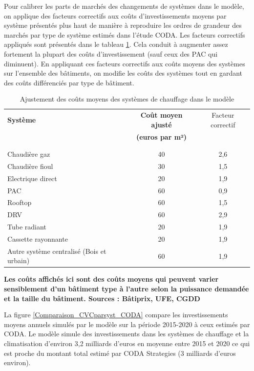 \documentclass[10.5pt,a4paper]{article}
\begin{document}
{Pour calibrer les parts de marchés des changements de systèmes dans le modèle, on applique des facteurs correctifs aux coûts d'investissements moyens par système présentés plus haut de manière à reproduire les ordres de grandeur des marchés par type de système estimés dans l'étude CODA. Les facteurs correctifs appliqués sont présentés dans le tableau \ref{Coutsystajust}. Cela conduit à augmenter assez fortement la plupart des coûts d'investissement (sauf ceux des PAC qui diminuent). En appliquant ces facteurs correctifs aux coûts moyens des systèmes sur l'ensemble des bâtiments, on modifie les coûts des systèmes tout en gardant des coûts différenciés par type de bâtiment. 

\begin{table}[h!]
\scriptsize
\caption{Ajustement des coûts moyens des systèmes de chauffage dans le modèle}
\label{Coutsystajust}
\begin{center}
\begin{tabular}{l|c|c}
\textbf{Système}	&	\textbf{Coût moyen ajusté} & Facteur correctif \\
									& \textbf{(euros par m²)} &  \\
\\	\hline	\\	
Chaudière gaz	& 40 & 2,6\\	
Chaudière fioul & 30  & 1,5 \\	
Electrique direct	& 20  & 1,9 \\	
PAC	& 60 & 0,9 \\	
Rooftop	& 60  &  1,5 \\		
DRV	& 60 &  2,9\\	
Tube radiant	& 20 & 1,9 \\	
Cassette rayonnante	& 20& 1,9 \\	
Autre système centralisé (Bois et urbain)	& 60 & 1,9 \\	
\hline	
\end{tabular}
\end{center}
\footnotesize{\textbf{ Les coûts affichés ici sont des coûts moyens qui peuvent varier sensiblement d'un bâtiment type à l'autre selon la puissance demandée et la taille du bâtiment. Sources : Bâtiprix, UFE, CGDD}}
\end{table}

La figure \ref{Comparaison_CVCparsyst_CODA} compare les investissements moyens annuels simulés par le modèle sur la période 2015-2020 à ceux estimés par CODA. Le modèle simule des investissements dans les systèmes de chauffage et la climatisation d'environ 3,2 milliards d'euros en moyenne entre 2015 et 2020 ce qui est proche du montant total estimé par CODA Strategies (3 milliards d'euros environ). 

}
\end{document}
